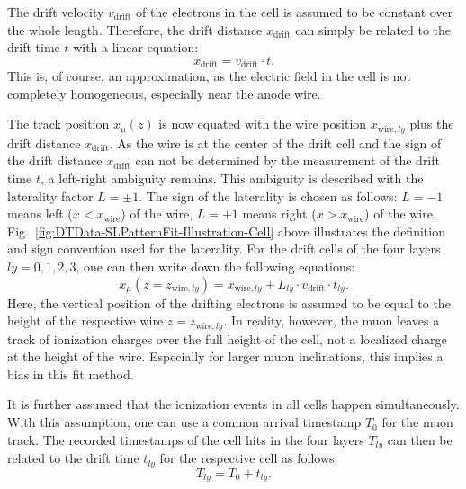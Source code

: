 \par The drift velocity $v_\text{drift}$ of the electrons in the cell is assumed to be constant over the whole length. Therefore, the drift distance $x_\text{drift}$ can simply be related to the drift time $t$ with a linear equation:
\begin{equation}
    x_\text{drift} = v_\text{drift} \cdot t.
    \label{eq:SLPatternFit-DriftDistance}
\end{equation}
This is, of course, an approximation, as the electric field in the cell is not completely homogeneous, especially near the anode wire.
\par The track position $x_\mu(z)$ is now equated with the wire position $x_{\text{wire},ly}$ plus the drift distance $x_\text{drift}$. As the wire is at the center of the drift cell and the sign of the drift distance $x_\text{drift}$ can not be determined by the measurement of the drift time $t$, a left-right ambiguity remains. This ambiguity is described with the laterality factor $L=\pm 1$. The sign of the laterality is chosen as follows: $L=-1$ means left ($x<x_\text{wire}$) of the wire, $L=+1$ means right ($x>x_\text{wire}$) of the wire. Fig.\ \ref{fig:DTData-SLPatternFit-Illustration-Cell} above illustrates the definition and sign convention used for the laterality. For the drift cells of the four layers $ly =0,1,2,3$, one can then write down the following equations:
\begin{equation}
    x_\mu (z=z_{\text{wire},ly}) = x_{\text{wire},ly} + L_{ly} \cdot v_\text{drift} \cdot t_{ly}.
    \label{eq:SLPatternFit-xPosition}
\end{equation}
Here, the vertical position of the drifting electrons is assumed to be equal to the height of the respective wire $z=z_{\text{wire},ly}$. In reality, however, the muon leaves a track of ionization charges over the full height of the cell, not a localized charge at the height of the wire. Especially for larger muon inclinations, this implies a bias in this fit method.
\par It is further assumed that the ionization events in all cells happen simultaneously. With this assumption, one can use a common arrival timestamp $T_0$ for the muon track. The recorded timestamps of the cell hits in the four layers $T_{ly}$ can then be related to the drift time $t_{ly}$ for the respective cell as follows:
\begin{equation}
    T_{ly} = T_0 + t_{ly}.
    \label{eq:SLPatternFit-Timestamp}
\end{equation}
